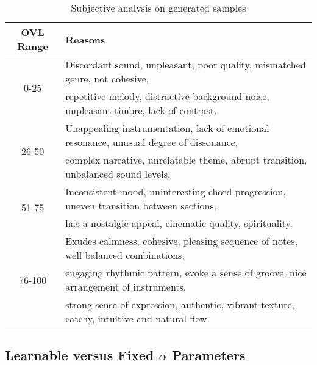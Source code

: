 \begin{table}[]
\small
\centering
\setlength{\tabcolsep}{5pt}
\renewcommand{\arraystretch}{0.25}
\resizebox{1.\columnwidth}{!}
{\begin{tabular}{c | l}
\toprule
\bf OVL Range & \bf  Reasons \\
\midrule
\multirow{2}{*}{0-25} & Discordant sound, unpleasant, poor quality, mismatched genre, not cohesive, \\
& repetitive melody, distractive background noise, unpleasant timbre, lack of contrast.  \\ \midrule
\multirow{2}{*}{26-50} & Unappealing instrumentation, lack of emotional resonance, unusual degree of dissonance, \\
& complex narrative, unrelatable theme, abrupt transition, unbalanced sound levels. \\ \midrule
\multirow{2}{*}{51-75} & Inconsistent mood, uninteresting chord progression, uneven transition between sections, \\
& has a nostalgic appeal, cinematic quality, spirituality. \\ \midrule
\multirow{3}{*}{76-100} & Exudes calmness,  cohesive, pleasing sequence of notes, well balanced combinations,  \\
& engaging rhythmic pattern, evoke a sense of groove, nice arrangement of instruments, \\
& strong sense of expression, authentic, vibrant texture, catchy, intuitive and natural flow.   \\
\bottomrule
\end{tabular}}
\caption{Subjective analysis on generated samples}
\label{tab:subjective_rebuttal}
\end{table}

\subsection{Learnable versus Fixed $\alpha$ Parameters}

